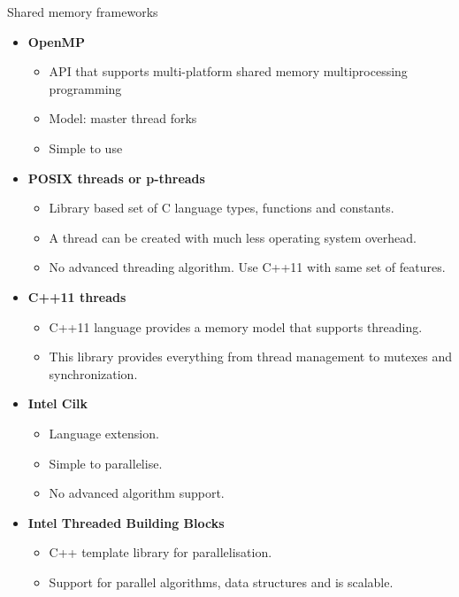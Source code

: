 \documentclass[10pt,times]{beamer}
\begin{document}
\begin{frame}{Shared memory frameworks}
\begin{itemize}
\item \textbf{OpenMP}
\begin{itemize}
\item API that supports multi-platform shared memory multiprocessing programming
\item Model: master thread forks 
\item Simple to use
\end{itemize}

\item \textbf{POSIX threads or p-threads}
\begin{itemize}
\item Library based set of C language types, functions and constants. 
\item A thread can be created with much less operating system overhead.
\item No advanced threading algorithm. Use C++11 with same set of features.
\end{itemize}

\item \textbf{C++11 threads}
\begin{itemize}
\item C++11 language provides a memory model that supports threading.
\item This library provides everything from thread management to mutexes and 
synchronization. 
\end{itemize}

\item \textbf{Intel Cilk}
\begin{itemize}
\item Language extension.
\item Simple to parallelise.
\item No advanced algorithm support.
\end{itemize}

\item \textbf{Intel Threaded Building Blocks}
\begin{itemize}
\item C++ template library for parallelisation.
\item Support for parallel algorithms, data structures and is scalable.
\end{itemize}
\end{itemize}

\end{frame}
\end{document}
